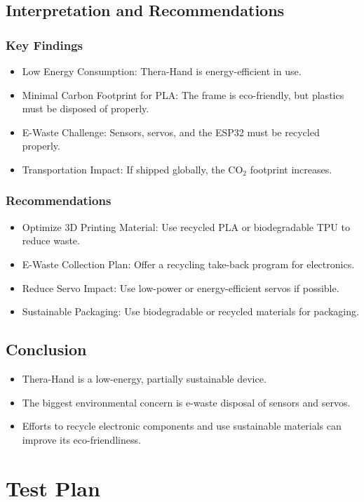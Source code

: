 \documentclass{article}
\begin{document}
\subsection{Interpretation and Recommendations}
\subsubsection{Key Findings}
\begin{itemize}
    \item Low Energy Consumption: Thera-Hand is energy-efficient in use.
    \item Minimal Carbon Footprint for PLA: The frame is eco-friendly, but plastics must be disposed
of properly.
    \item E-Waste Challenge: Sensors, servos, and the ESP32 must be recycled properly.
    \item Transportation Impact: If shipped globally, the CO$_2$ footprint increases.
\end{itemize}
\subsubsection{Recommendations}
\begin{itemize}
    \item Optimize 3D Printing Material: Use recycled PLA or biodegradable TPU to reduce waste.
    \item E-Waste Collection Plan: Offer a recycling take-back program for electronics.
    \item Reduce Servo Impact: Use low-power or energy-efficient servos if possible.
    \item Sustainable Packaging: Use biodegradable or recycled materials for packaging.
\end{itemize}

\subsection{Conclusion}
\begin{itemize}
\item Thera-Hand is a low-energy, partially sustainable device.
\item The biggest environmental concern is e-waste disposal of sensors and servos.
\item Efforts to recycle electronic components and use sustainable materials can improve its
eco-friendliness.
\end{itemize}
\section{Test Plan}
\end{document}
